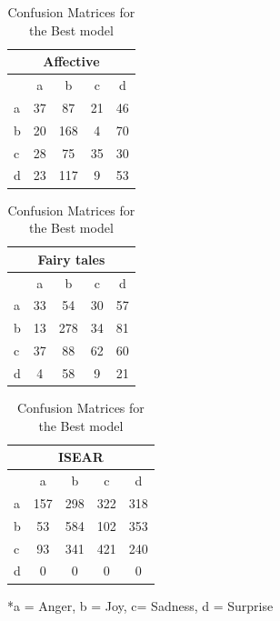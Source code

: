 \documentclass[11pt]{article}
\begin{document}
\begin{table}[hbt]
            \footnotesize
                \begin{tabular}[t]{|l|c|c|c|c|}
                    \hline
                    \multicolumn{5}{|c|}{{Affective}} \\    
                    \hline
                    &a&b&c&d\\ \hline
                    a&37&87&21&46 \\ \hline
                    b&20&168&4&70\\ \hline
                    c&28&75&35&30 \\ \hline   
                    d&23&117&9&53\\ \hline
                \end{tabular}
                \hfill
                \begin{tabular}[t]{|l|c|c|c|c|}
                    \hline
                    \multicolumn{5}{|c|}{{Fairy tales}} \\    
                    \hline
                    &a&b&c&d\\ \hline
                    a&33&54&30&57 \\ \hline
                    b&13&278&34&81\\ \hline
                    c&37&88&62&60 \\ \hline   
                    d&4&58&9&21\\ \hline
                \end{tabular}
                \hfill
                \begin{tabular}[t]{|l|c|c|c|c|}
                    \hline
                    \multicolumn{5}{|c|}{{ISEAR}} \\    
                    \hline
                    &a&b&c&d\\ \hline
                    a&157&298&322&318 \\ \hline
                    b&53&584&102&353\\ \hline
                    c&93&341&421&240 \\ \hline   
                    d&0&0&0&0\\ \hline
                \end{tabular}
                \caption{Confusion Matrices for the Best model}
                \label{Confusion Matrices for the Best model}
                *a = Anger, b = Joy, c= Sadness, d = Surprise
            \end{table}
\end{document}
